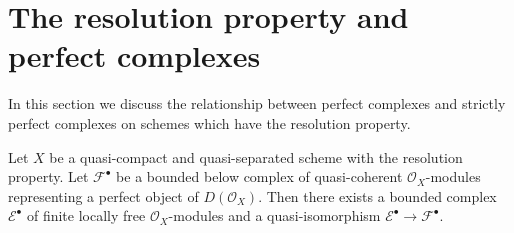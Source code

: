 \section{The resolution property and perfect complexes}
\label{section-resolution-property-perfect}

\noindent
In this section we discuss the relationship between perfect complexes
and strictly perfect complexes on schemes which have the resolution property.

\begin{lemma}
\label{lemma-construct-strictly-perfect}
Let $X$ be a quasi-compact and quasi-separated scheme with the
resolution property.
Let $\mathcal{F}^\bullet$ be a bounded below complex of quasi-coherent
$\mathcal{O}_X$-modules representing a perfect object of
$D(\mathcal{O}_X)$. Then there exists a bounded complex
$\mathcal{E}^\bullet$ of finite locally free $\mathcal{O}_X$-modules
and a quasi-isomorphism $\mathcal{E}^\bullet \to \mathcal{F}^\bullet$.
\end{lemma}

